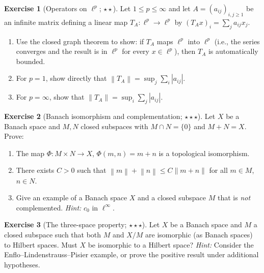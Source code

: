 \documentclass[a4paper,12pt]{book}
\newcommand{\norm}[1]{\left\| #1 \right\|}
\newcommand{\abs}[1]{\left| #1 \right|}
\theoremstyle{definition}
\newtheorem{exercise}{Exercise}[chapter]
\theoremstyle{plain}
\theoremstyle{remark}
\begin{document}
\begin{exercise}[Operators on $\ell^p$; $\star\star$]\label{ex:operators-ell-p}
Let $1 \leq p \leq \infty$ and let $A = (a_{ij})_{i,j \geq 1}$ be an infinite matrix
defining a linear map $T_A \colon \ell^p \to \ell^p$ by
$(T_A x)_i = \sum_j a_{ij} x_j$.
\begin{enumerate}[label=(\alph*)]
  \item Use the closed graph theorem to show: if $T_A$ maps $\ell^p$ into $\ell^p$
    (i.e., the series converges and the result is in $\ell^p$ for every
    $x \in \ell^p$), then $T_A$ is automatically bounded.
  \item For $p = 1$, show directly that $\norm{T_A} = \sup_j \sum_i \abs{a_{ij}}$.
  \item For $p = \infty$, show that $\norm{T_A} = \sup_i \sum_j \abs{a_{ij}}$.
\end{enumerate}
\end{exercise}

\begin{exercise}[Banach isomorphism and complementation; $\star\star\star$]%
\label{ex:complementation}
Let $X$ be a Banach space and $M, N$ closed subspaces with $M \cap N = \{0\}$
and $M + N = X$. Prove:
\begin{enumerate}[label=(\alph*)]
  \item The map $\Phi \colon M \times N \to X$, $\Phi(m,n) = m + n$ is a
    topological isomorphism.
  \item There exists $C > 0$ such that $\norm{m} + \norm{n} \leq C\norm{m+n}$
    for all $m \in M$, $n \in N$.
  \item Give an example of a Banach space $X$ and a closed subspace $M$ that is
    \emph{not} complemented. \textit{Hint:} $c_0$ in $\ell^\infty$.
\end{enumerate}
\end{exercise}

\begin{exercise}[The three-space property; $\star\star\star$]%
\label{ex:three-space}
Let $X$ be a Banach space and $M$ a closed subspace such that both $M$ and $X/M$
are isomorphic (as Banach spaces) to Hilbert spaces. Must $X$ be isomorphic to a
Hilbert space? \textit{Hint:} Consider the Enflo--Lindenstrauss--Pisier example,
or prove the positive result under additional hypotheses.
\end{exercise}
\end{document}
